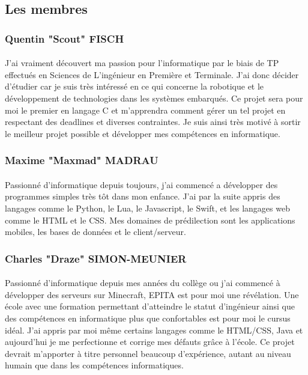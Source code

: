 \documentclass{article}
\begin{document}
\subsection{Les membres}
\subsubsection{Quentin "Scout" FISCH}
\paragraph{}J'ai vraiment découvert ma passion pour l'informatique par le biais de TP effectués en Sciences de L'ingénieur en Première et Terminale. J'ai donc décider d'étudier car je suis très intéressé en ce qui concerne la robotique et le développement de technologies dans les systèmes embarqués. Ce projet sera pour moi le premier en langage C et m'apprendra comment gérer un tel projet en respectant des deadlines et diverses contraintes. Je suis ainsi très motivé à sortir le meilleur projet possible et développer mes compétences en informatique.

\subsubsection{Maxime "Maxmad" MADRAU}
\paragraph{}Passionné d'informatique depuis toujours, j'ai commencé a développer des programmes simples très tôt dans mon enfance. J'ai par la suite appris des langages comme le Python, le Lua, le Javascript, le Swift, et les langages web comme le HTML et le CSS. Mes domaines de prédilection sont les applications mobiles, les bases de données et le client/serveur.

\subsubsection{Charles "Draze" SIMON-MEUNIER}
\paragraph{}Passionné d'informatique depuis mes années du collège ou j'ai commencé à développer des serveurs sur Minecraft, EPITA est pour moi une révélation. Une école avec une formation permettant d'atteindre le statut d'ingénieur ainsi que des compétences en informatique plus que confortables est pour moi le cursus idéal. J'ai appris par moi même certains langages comme le HTML/CSS, Java et aujourd'hui je me perfectionne et corrige mes défauts grâce à l'école. Ce projet devrait m'apporter à titre personnel beaucoup d'expérience, autant au niveau humain que dans les compétences informatiques.
\end{document}
